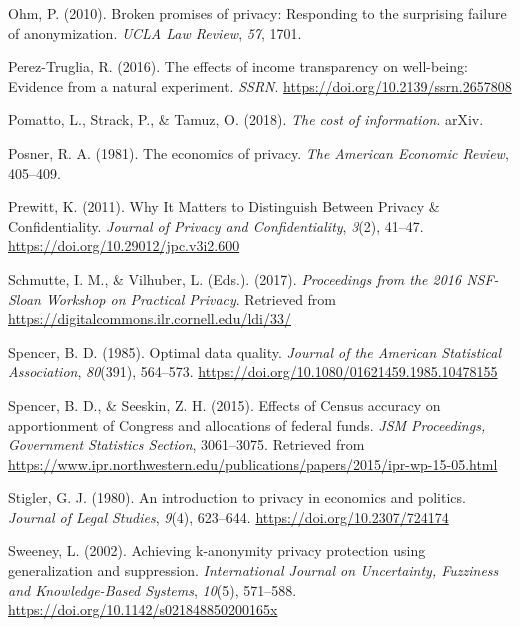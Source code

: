 \documentclass[]{article}
\begin{document}
\hypertarget{ref-Ohm:Broken:UCLALR:2010}{}
Ohm, P. (2010). Broken promises of privacy: Responding to the surprising
failure of anonymization. \emph{UCLA Law Review}, \emph{57}, 1701.

\hypertarget{ref-perez-truglia:transparency:SSRN:2016}{}
Perez-Truglia, R. (2016). The effects of income transparency on
well-being: Evidence from a natural experiment. \emph{SSRN}.
\url{https://doi.org/10.2139/ssrn.2657808}

\hypertarget{ref-PomattoTheCostOfInformation2018}{}
Pomatto, L., Strack, P., \& Tamuz, O. (2018). \emph{The cost of
information}. arXiv.

\hypertarget{ref-posner1981economics}{}
Posner, R. A. (1981). The economics of privacy. \emph{The American
Economic Review}, 405--409.

\hypertarget{ref-prewitt:2011}{}
Prewitt, K. (2011). Why It Matters to Distinguish Between Privacy \&
Confidentiality. \emph{Journal of Privacy and Confidentiality},
\emph{3}(2), 41--47. \url{https://doi.org/10.29012/jpc.v3i2.600}

\hypertarget{ref-Proc:NSF-Sloan:2017}{}
Schmutte, I. M., \& Vilhuber, L. (Eds.). (2017). \emph{Proceedings from
the 2016 NSF-Sloan Workshop on Practical Privacy}. Retrieved from
\url{https://digitalcommons.ilr.cornell.edu/ldi/33/}

\hypertarget{ref-Spencer:Optimal:JASA:1985}{}
Spencer, B. D. (1985). Optimal data quality. \emph{Journal of the
American Statistical Association}, \emph{80}(391), 564--573.
\url{https://doi.org/10.1080/01621459.1985.10478155}

\hypertarget{ref-Seeskin:Spencer:Effects:2015}{}
Spencer, B. D., \& Seeskin, Z. H. (2015). Effects of Census accuracy on
apportionment of Congress and allocations of federal funds. \emph{JSM
Proceedings, Government Statistics Section}, 3061--3075. Retrieved from
\url{https://www.ipr.northwestern.edu/publications/papers/2015/ipr-wp-15-05.html}

\hypertarget{ref-stigler1980introduction}{}
Stigler, G. J. (1980). An introduction to privacy in economics and
politics. \emph{Journal of Legal Studies}, \emph{9}(4), 623--644.
\url{https://doi.org/10.2307/724174}

\hypertarget{ref-sweeney:2002}{}
Sweeney, L. (2002). Achieving k-anonymity privacy protection using
generalization and suppression. \emph{International Journal on
Uncertainty, Fuzziness and Knowledge-Based Systems}, \emph{10}(5),
571--588. \url{https://doi.org/10.1142/s021848850200165x}
\end{document}
